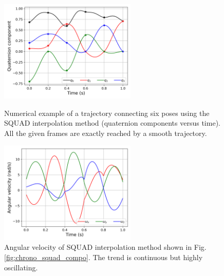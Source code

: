 \begin{figure}[tbp]
    \begin{minipage}[t]{0.49\textwidth}
        \centering
        \includegraphics[width=6.5cm]{figures/chrono_squad_compo.png}
        \caption{Numerical example of a trajectory connecting six poses using the SQUAD interpolation method (quaternion components versus time). All the given frames are exactly reached by a smooth trajectory.}
        \label{fig:chrono_squad_compo}
    \end{minipage}
    \hfill
    \begin{minipage}[t]{0.49\textwidth}
        \centering
        \includegraphics[width=6.5cm]{figures/chrono_squad_vel.png}
        \caption{Angular velocity of SQUAD interpolation method shown in Fig. \ref{fig:chrono_squad_compo}. The trend is continuous but highly oscillating.}
        \label{fig:chrono_squad_vel}
    \end{minipage}
\end{figure}

